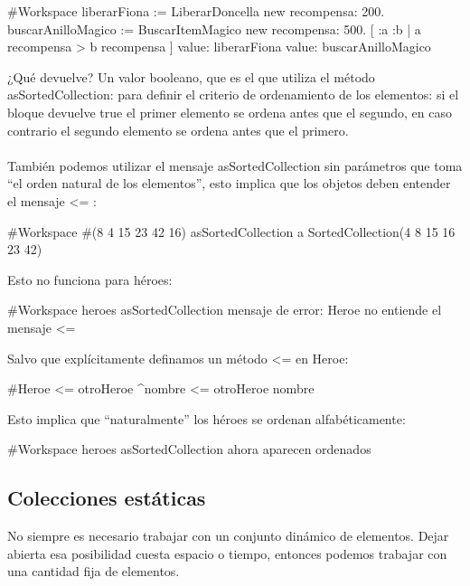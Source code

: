 \documentclass[a4paper,12pt]{book}
\begin{document}
\begin{code}
#Workspace
liberarFiona := LiberarDoncella new recompensa: 200.
buscarAnilloMagico := BuscarItemMagico new recompensa: 500.
[ :a :b | a recompensa > b recompensa ] 
     value: liberarFiona value: buscarAnilloMagico
\end{code}

¿Qué devuelve? Un valor booleano, que es el que utiliza el método asSortedCollection: para definir el criterio
de ordenamiento de los elementos: si el bloque devuelve true el primer elemento se ordena antes que el segundo,
en caso contrario el segundo elemento se ordena antes que el primero.
\\
\\
También podemos utilizar el mensaje asSortedCollection sin parámetros que toma ``el orden natural de los 
elementos'', esto implica que los objetos deben entender el mensaje \textless= :

\begin{code}
#Workspace
#(8 4 15 23 42 16) asSortedCollection 
  a SortedCollection(4 8 15 16 23 42)
\end{code}

\vspace{\baselineskip}
Esto no funciona para héroes:

\begin{code}
#Workspace
heroes asSortedCollection
  {mensaje de error: Heroe no entiende el mensaje <=}
\end{code}

\vspace{\baselineskip}
Salvo que explícitamente definamos un método \textless= en Heroe:

\begin{code}
#Heroe
<= otroHeroe
   ^nombre <= otroHeroe nombre
\end{code}

Esto implica que ``naturalmente'' los héroes se ordenan alfabéticamente:

\begin{code}
#Workspace
heroes asSortedCollection
  {ahora aparecen ordenados}
\end{code}


\subsection{Colecciones estáticas}

No siempre es necesario trabajar con un conjunto dinámico de elementos. Dejar abierta esa posibilidad cuesta
espacio o tiempo, entonces podemos trabajar con una cantidad fija de elementos.
\end{document}
